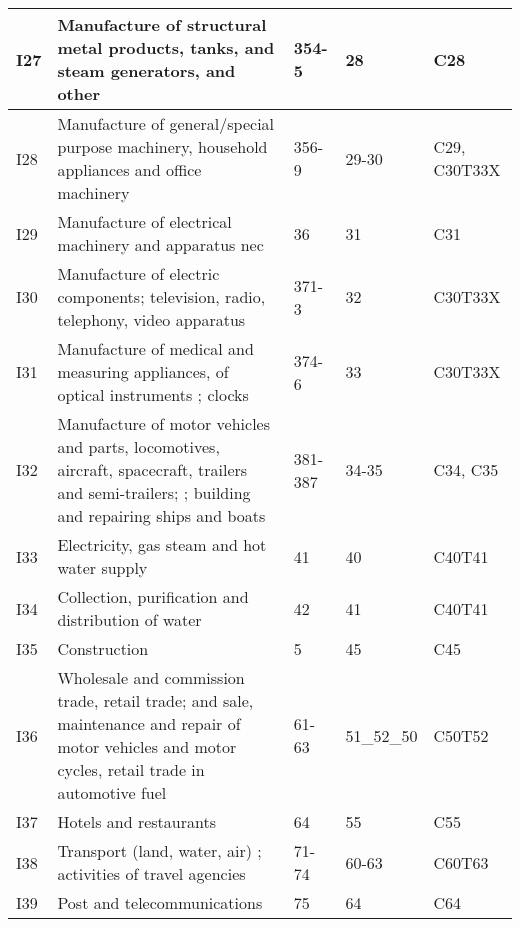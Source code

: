 \documentclass[12pt,english]{article}
\begin{document}
\begin{table}[ht]
\begin{adjustbox}{width=\textwidth}
\begin{tabular}{lp{500pt}lll}
		I27 & Manufacture of structural metal products, tanks, %
		and steam generators, and other %
		& 354-5 & 28 & C28 \\ \midrule
		I28 & Manufacture of general/special purpose machinery, %
		household appliances and office %
		machinery & 356-9 & 29-30 & C29, C30T33X \\ \midrule
		I29 & Manufacture of electrical machinery and apparatus nec & 36 & 31 & C31 \\ \midrule
		I30 & Manufacture of %
		electric components; television, %
		radio, %
		telephony, %
		video %
		apparatus %
		& 371-3 & 32 & C30T33X \\ \midrule
		I31 & Manufacture of medical and measuring appliances, %
		of optical instruments %
		; %
		clocks & 374-6 & 33 & C30T33X \\ \midrule
		I32 & Manufacture of motor vehicles and parts, %
		locomotives, aircraft, spacecraft, trailers and semi-trailers; %
		; building and repairing ships and boats%
		& 381-387 & 34-35 & C34, C35 \\ \midrule
		I33 & Electricity, gas steam and hot water supply & 41 & 40 & C40T41 \\ \midrule
		I34 & Collection, purification and distribution of water & 42 & 41 & C40T41 \\ \midrule
		I35 & Construction & 5 & 45 & C45 \\ \midrule
		I36 & Wholesale and commission trade, retail trade; and sale, maintenance and repair of motor vehicles and motor cycles, retail trade in automotive fuel & 61-63 & 51\_52\_50 & C50T52 \\ \midrule
		I37 & Hotels and restaurants & 64 & 55 & C55 \\ \midrule
		I38 & Transport (land, water, air) ; %
		activities of travel agencies & 71-74 & 60-63 & C60T63 \\ \midrule
		I39 & Post and telecommunications & 75 & 64 & C64 \\ \midrule

\end{tabular}
\end{adjustbox}
\end{table}
\end{document}
